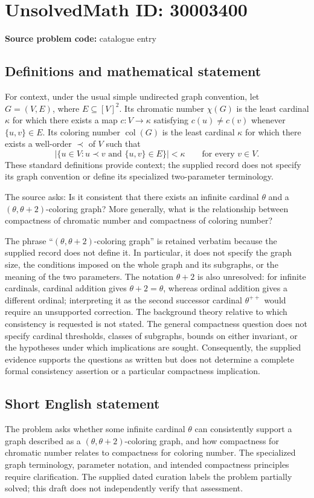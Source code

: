 \documentclass[11pt]{article}
\begin{document}
\section*{UnsolvedMath ID: 30003400}
\textbf{Source problem code:} catalogue entry
\subsection{Definitions and mathematical statement}
For context, under the usual simple undirected graph convention, let \(G=(V,E)\), where \(E\subseteq [V]^2\). Its chromatic number \(\chi(G)\) is the least cardinal \(\kappa\) for which there exists a map \(c:V\to\kappa\) satisfying \(c(u)\ne c(v)\) whenever \(\{u,v\}\in E\). Its coloring number \(\operatorname{col}(G)\) is the least cardinal \(\kappa\) for which there exists a well-order \(\prec\) of \(V\) such that
\[
\left|\{u\in V:u\prec v\text{ and }\{u,v\}\in E\}\right|<\kappa
\qquad\text{for every }v\in V.
\]
These standard definitions provide context; the supplied record does not specify its graph convention or define its specialized two-parameter terminology.

The source asks: Is it consistent that there exists an infinite cardinal \(\theta\) and a \((\theta,\theta+2)\)-coloring graph? More generally, what is the relationship between compactness of chromatic number and compactness of coloring number?

The phrase ``\((\theta,\theta+2)\)-coloring graph'' is retained verbatim because the supplied record does not define it. In particular, it does not specify the graph size, the conditions imposed on the whole graph and its subgraphs, or the meaning of the two parameters. The notation \(\theta+2\) is also unresolved: for infinite cardinals, cardinal addition gives \(\theta+2=\theta\), whereas ordinal addition gives a different ordinal; interpreting it as the second successor cardinal \(\theta^{++}\) would require an unsupported correction. The background theory relative to which consistency is requested is not stated. The general compactness question does not specify cardinal thresholds, classes of subgraphs, bounds on either invariant, or the hypotheses under which implications are sought. Consequently, the supplied evidence supports the questions as written but does not determine a complete formal consistency assertion or a particular compactness implication.
\subsection{Short English statement}
The problem asks whether some infinite cardinal \(\theta\) can consistently support a graph described as a \((\theta,\theta+2)\)-coloring graph, and how compactness for chromatic number relates to compactness for coloring number. The specialized graph terminology, parameter notation, and intended compactness principles require clarification. The supplied dated curation labels the problem partially solved; this draft does not independently verify that assessment.
\end{document}
